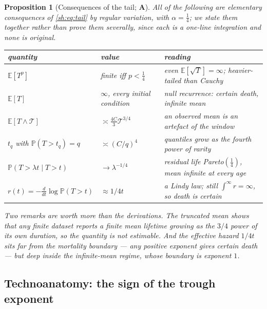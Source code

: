 \documentclass[11pt]{article}
\numberwithin{equation}{section}
\theoremstyle{plain}
\newtheorem{proposition}[theorem]{Proposition}
\theoremstyle{definition}
\theoremstyle{remark}
\newcommand{\E}{\mathbb{E}}
\newcommand{\PP}{\mathbb{P}}
\begin{document}
\begin{proposition}[Consequences of the tail; \textbf{A}]
\label{sh:prop:tailconseq}\label{sh:cor:moments}\label{sh:cor:mean}%
\label{sh:cor:trunc}\label{sh:cor:quant}\label{sh:cor:residual}%
\label{sh:cor:lindy}
All of the following are elementary consequences of \eqref{sh:eq:tail}
by regular variation, with $\alpha=\tfrac14$; we state them together
rather than prove them severally, since each is a one-line integration
and none is original.

\begin{center}\small
\begin{tabular}{@{}lll@{}}
\toprule
quantity & value & reading\\
\midrule
$\E[T^{p}]$ & finite iff $p<\tfrac14$ &
even $\E[\sqrt T]=\infty$; heavier-tailed than Cauchy\\
$\E[T]$ & $\infty$, every initial condition &
null recurrence: certain death, infinite mean\\
$\E[T\wedge\mathcal T]$ & $\asymp\tfrac{4C}{3}\mathcal T^{3/4}$ &
an observed mean is an artefact of the window\\
$t_q$ with $\PP(T>t_q)=q$ & $\asymp(C/q)^{4}$ &
quantiles grow as the fourth power of rarity\\
$\PP(T>\lambda t\mid T>t)$ & $\to\lambda^{-1/4}$ &
residual life Pareto$(\tfrac14)$, mean infinite at every age\\
$r(t)=-\tfrac{d}{dt}\log\PP(T>t)$ & $\approx 1/4t$ &
a Lindy law; still $\int^\infty r=\infty$, so death is certain\\
\bottomrule
\end{tabular}
\end{center}

\noindent Two remarks are worth more than the derivations. The truncated
mean shows that any finite dataset reports a finite mean lifetime
growing as the $3/4$ power of its own duration, so the quantity is not
estimable. And the effective hazard $1/4t$ sits far from the mortality
boundary --- any positive exponent gives certain death --- but deep
inside the infinite-mean regime, whose boundary is exponent $1$.
\end{proposition}

\subsection{Technoanatomy: the sign of the trough exponent}
\label{gr1:sub:anatomy}
\end{document}
